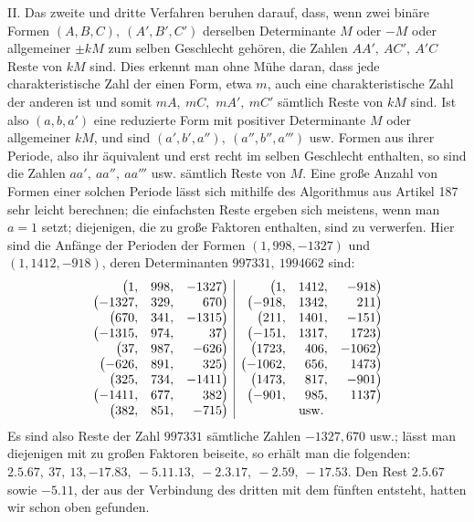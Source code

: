 \begin{samepage}
II. Das zweite und dritte Verfahren beruhen darauf, dass, wenn zwei binäre Formen \((A,\allowbreak B,\allowbreak C),\allowbreak \ (A',\allowbreak B',\allowbreak C')\) derselben Determinante \(M\) oder \(-M\) oder allgemeiner \(\pm kM\) zum selben Geschlecht gehören, die Zahlen \(AA',\allowbreak \ AC',\allowbreak \ A'C\) Reste von \(kM\) sind. Dies erkennt man ohne Mühe daran, dass jede charakteristische Zahl der einen Form, etwa \(m\), auch eine charakteristische Zahl der anderen ist und somit \(mA,\allowbreak \ mC,\allowbreak \)
\(mA',\allowbreak \ mC'\) sämtlich Reste von \(kM\) sind. Ist also \((a,\allowbreak b,\allowbreak a')\) eine reduzierte Form mit positiver Determinante \(M\) oder allgemeiner \(kM\), und sind \((a',\allowbreak b',\allowbreak a''),\allowbreak \ (a'',\allowbreak b'',\allowbreak a''')\) usw. Formen aus ihrer Periode, also ihr äquivalent und erst recht im selben Geschlecht enthalten, so sind die Zahlen \(aa',\allowbreak \ aa'',\allowbreak \ aa'''\) usw. sämtlich Reste von \(M\). Eine große Anzahl von Formen einer solchen Periode lässt sich mithilfe des Algorithmus aus Artikel 187 sehr leicht berechnen; die einfachsten Reste ergeben sich meistens, wenn man \(a=1\) setzt; diejenigen, die zu große Faktoren enthalten, sind zu verwerfen. Hier sind die Anfänge der Perioden der Formen \((1,\allowbreak 998,\allowbreak -1327)\) und \((1,\allowbreak 1412,\allowbreak -918)\), deren Determinanten \(997331,\allowbreak \ 1994662\) sind: \[\begin{array}{rrr|rrr}\bigl(1,&998,&-1327\bigr)&\bigl(1,&1412,&-918\bigr)\\ \bigl(-1327,&329,&670\bigr)&\bigl(-918,&1342,&211\bigr)\\ \bigl(670,&341,&-1315\bigr)&\bigl(211,&1401,&-151\bigr)\\ \bigl(-1315,&974,&37\bigr)&\bigl(-151,&1317,&1723\bigr)\\ \bigl(37,&987,&-626\bigr)&\bigl(1723,&406,&-1062\bigr)\\ \bigl(-626,&891,&325\bigr)&\bigl(-1062,&656,&1473\bigr)\\ \bigl(325,&734,&-1411\bigr)&\bigl(1473,&817,&-901\bigr)\\ \bigl(-1411,&677,&382\bigr)&\bigl(-901,&985,&1137\bigr)\\ \bigl(382,&851,&-715\bigr)&\multicolumn{3}{c}{\mathrm{usw.}}\end{array}\] Es sind also Reste der Zahl \(997331\) sämtliche Zahlen \(-1327,\allowbreak 670\) usw.; lässt man diejenigen mit zu großen Faktoren beiseite, so erhält man die folgenden: \(2.5.67,\allowbreak \ 37,\allowbreak \ 13,\allowbreak -17.83,\allowbreak \ -5.11.13,\allowbreak \ -2.3.17,\allowbreak \ -2.59,\allowbreak \ -17.53\). Den Rest \(2.5.67\) sowie \(-5.11\), der aus der Verbindung des dritten mit dem fünften entsteht, hatten wir schon oben gefunden.
\par\end{samepage}


